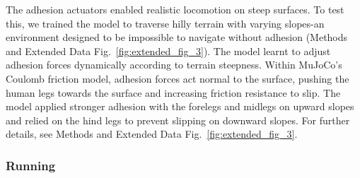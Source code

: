 \documentclass[sn-mathphys-num]{sn-jnl}%
\theoremstyle{thmstyleone}%
\theoremstyle{thmstyletwo}%
\theoremstyle{thmstylethree}%
\begin{document}
The adhesion actuators enabled realistic locomotion on steep surfaces. 
To test this, we trained the model to traverse hilly terrain with varying slopes-an environment designed to be impossible to navigate without adhesion (Methods and Extended Data Fig.~\ref{fig:extended_fig_3}). 
The model learnt to adjust adhesion forces dynamically according to terrain steepness. 
Within MuJoCo's Coulomb friction model, adhesion forces act normal to the surface, pushing the human legs towards the surface and increasing friction resistance to slip. 
The model applied stronger adhesion with the forelegs and midlegs on upward slopes and relied on the hind legs to prevent slipping on downward slopes. 
For further details, see Methods and Extended Data Fig.~\ref{fig:extended_fig_3}.




\subsubsection{Running}
\end{document}
